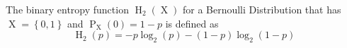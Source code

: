 The binary entropy function $\operatorname{H}_2(\operatorname{X})$ for a Bernoulli Distribution that has $\operatorname{X} = \left\{ 0, 1 \right\}$ and $\operatorname{P}_{\operatorname{X}}(0) = 1 - p$ is defined as
$$\operatorname{H}_2(p) = -p \log_2(p) - (1 - p) \log_2(1 - p)$$
